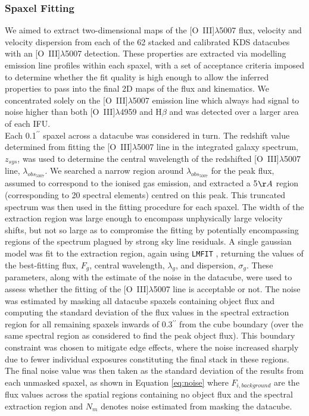 \documentclass[fleqn,usenatbib]{mnras}
\begin{document}
\subsubsection{Spaxel Fitting}\label{subsubsection:spaxel_fitting}
We aimed to extract two-dimensional maps of the [O~{\sc III}]$\lambda$5007 flux, velocity and velocity dispersion from each of the 62 stacked and calibrated KDS datacubes with an [O~{\sc III}]$\lambda$5007 detection.
These properties are extracted via modelling emission line profiles within each spaxel, with a set of acceptance criteria imposed to determine whether the fit quality is high enough to allow the inferred properties to pass into the final 2D maps of the flux and kinematics.
We concentrated solely on the [O~{\sc III}]$\lambda$5007 emission line which always had signal to noise higher than both [O~{\sc III}]$\lambda$4959 and H$\beta$ and was detected over a larger area of each IFU. \\

Each 0.1$^{\prime\prime}$ spaxel across a datacube was considered in turn.
The redshift value determined from fitting the [O~{\sc III}]$\lambda$5007 line in the integrated galaxy spectrum, $z_{sys}$, was used to determine the central wavelength of the redshifted [O~{\sc III}]$\lambda$5007 line, $\lambda_{obs_{5007}}$. 
We searched a narrow region around $\lambda_{obs_{5007}}$ for the peak flux, assumed to correspond to the ionised gas emission, and extracted a 5$\AA$ region (corresponding to 20 spectral elements) centred on this peak.
This truncated spectrum was then used in the fitting procedure for each spaxel.
The width of the extraction region was large enough to encompass unphysically large velocity shifts, but not so large as to compromise the fitting by potentially encompassing regions of the spectrum plagued by strong sky line residuals.
A single gaussian model was fit to the extraction region, again using {\tt LMFIT} \citep{Newville2014}, returning the values of the best-fitting flux, $F_{g}$, central wavelength, $\lambda_{g}$, and dispersion, $\sigma_{g}$.
These parameters, along with the estimate of the noise in the datacube, were used to assess whether the fitting of the [O~{\sc III}]$\lambda$5007 line is acceptable or not. 
The noise was estimated by masking all datacube spaxels containing object flux and computing the standard deviation of the flux values in the spectral extraction region for all remaining spaxels inwards of 0.3$^{\prime\prime}$ from the cube boundary (over the same spectral region as considered to find the peak object flux).
This boundary constraint was chosen to mitigate edge effects, where the noise increased sharply due to fewer individual exposures constituting the final stack in these regions.
The final noise value was then taken as the standard deviation of the results from each unmasked spaxel, as shown in Equation \ref{eq:noise} where $F_{i,background}$ are the flux values across the spatial regions containing no object flux and the spectral extraction region and $N_{m}$ denotes noise estimated from masking the datacube.
\end{document}
